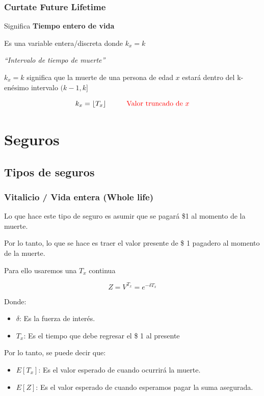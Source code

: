 \documentclass[12pt, a4paper, footinclude=true]{scrbook}
\begin{document}
\subsubsection{Curtate Future Lifetime}

Significa \textbf{Tiempo entero de vida}

Es una variable entera/discreta donde $k_x = k$

\textit{``Intervalo de tiempo de muerte''}

$k_x = k$ significa que la muerte de una persona de edad $x$ estará dentro del k-enésimo intervalo $(k-1, k]$

$$k_x = \lfloor T_x \rfloor \hspace{1cm} \text{\color{red} Valor truncado de $x$}$$ 

\section{Seguros}

\subsection{Tipos de seguros}

\subsubsection{Vitalicio / Vida entera (Whole life)}

Lo que hace este tipo de seguro es asumir que se pagará \$1 al momento de la muerte. 

Por lo tanto, lo que se hace es traer el valor presente de \$ 1 pagadero al momento de la muerte. 

Para ello usaremos una $T_x$ continua

\[
	Z = V^{T_x} = e^{-\delta T_x}
\]

Donde: 
\begin{itemize}
	\item $\delta$: Es la fuerza de interés. 
	\item $T_x$: Es el tiempo que debe regresar el  \$ 1 al presente 
\end{itemize}

Por lo tanto, se puede decir que: 

\begin{itemize}
	\item $E[T_x]$: Es el valor esperado de cuando ocurrirá la muerte. 
	\item $E[Z]$: Es el valor esperado de cuando esperamos pagar la suma asegurada.
\end{itemize}
\end{document}
